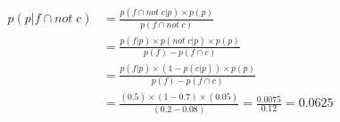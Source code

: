 \begin{align*}
p(p|f\cap not\; c)&=\frac{p(f\cap not\; c|p)\times p(p)}{p(f\cap not\; c)} \\
&=\frac{p(f|p)\times p(not \; c|p)\times p(p)}{p(f)-p(f \cap c)} \\
&=\frac{p(f|p)\times (1- p(c|p))\times p(p)}{p(f)-p(f \cap c)} \\
&=\frac{(0.5)\times (1-0.7)\times (0.05)}{(0.2-0.08)}=\frac{0.0075}{0.12}=0.0625
\end{align*}